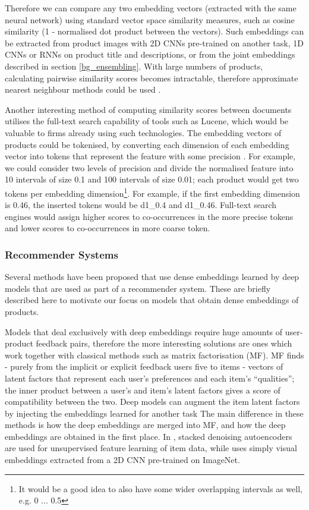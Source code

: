 Therefore we can compare any two embedding vectors (extracted with the same neural network) using standard vector space similarity measures, such as cosine similarity (1 - normalised dot product between the vectors).
Such embeddings can be extracted from product images with 2D CNNs pre-trained on another task, 1D CNNs or RNNs on product title and descriptions, or from the joint embeddings described in section \ref{bg_ensembling}.
With large numbers of products, calculating pairwise similarity scores becomes intractable, therefore approximate nearest neighbour methods could be used \cite{nmslib}.

Another interesting method of computing similarity scores between documents utilises the full-text search capability of tools such as Lucene, which would be valuable to firms already using such technologies.
The embedding vectors of products could be tokenised, by converting each dimension of each embedding vector into tokens that represent the feature with some precision \cite{vec_fulltext}.
For example, we could consider two levels of precision and divide the normalised feature into 10 intervals of size 0.1 and 100 intervals of size 0.01; each product would get two tokens per embedding dimension\footnote{It would be a good idea to also have some wider overlapping intervals as well, e.g. 0 ... 0.5}.
For example, if the first embedding dimension is 0.46, the inserted tokens would be d1\_0.4 and d1\_0.46.
Full-text search engines would assign higher scores to co-occurrences in the more precise tokens and lower scores to co-occurrences in more coarse token.

\subsubsection{Recommender Systems}
\label{rec}

Several methods have been proposed that use dense embeddings learned by deep models that are used as part of a recommender system.
These are briefly described here to motivate our focus on models that obtain dense embeddings of products.

Models that deal exclusively with deep embeddings \cite{mvdl} require huge amounts of user-product feedback pairs, therefore the more interesting solutions are ones which work together with classical methods such as matrix factorisation (MF).
MF finds - purely from the implicit or explicit feedback users five to items - vectors of latent factors that represent each user's preferences and each item's ``qualities''; the inner product between a user's and item's latent factors gives a score of compatibility between the two.
Deep models can augment the item latent factors by injecting the embeddings learned for another task
The main difference in these methods is how the deep embeddings are merged into MF, and how the deep embeddings are obtained in the first place.
In \cite{cdl}, stacked denoising autoencoders are used for unsupervised feature learning of item data, while \cite{dl_mf} uses simply visual embeddings extracted from a 2D CNN pre-trained on ImageNet.

